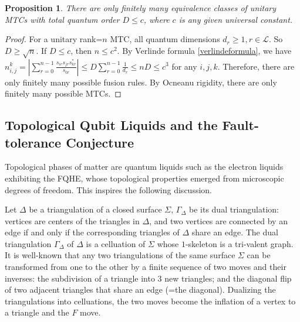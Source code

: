 \documentclass[12pt,psamsfonts]{amsart}
\newcommand{\mL}{\mathcal{L}}
\numberwithin{equation}{section}
\newtheorem{prop}[theorem]{Proposition}
\theoremstyle{definition}
\begin{document}
\begin{prop}

There are only finitely many equivalence classes of unitary MTCs
with total quantum order $D\leq  c$, where $c$ is any given
universal constant.

\end{prop}

\begin{proof}

For a unitary rank=$n$ MTC, all quantum dimensions $d_r\geq 1,
r\in \mL$. So $D\geq \sqrt{n}$.  If $D\leq c$, then $n\leq c^2$.
By Verlinde formula \ref{verlindeformula}, we have
$n_{i,j}^k=|\sum_{r=0}^{n-1}
\frac{s_{ir}s_{jr}s^{*}_{kr}}{s_{0r}}|\leq
D\sum_{r=0}^{n-1}\frac{1}{d_r}\leq nD\leq c^3$ for any $i,j,k$.
Therefore, there are only finitely many possible fusion rules.  By
Ocneanu rigidity, there are only finitely many possible MTCs.

\end{proof}

\subsection{Topological Qubit Liquids and the Fault-tolerance Conjecture}

 Topological phases of matter are quantum liquids such as the
 electron liquids exhibiting the FQHE, whose topological
 properties emerged from microscopic degrees of freedom.  This
 inspires the following discussion.

 Let $\Delta$ be a triangulation of a closed surface $\Sigma$,
 $\Gamma_{\Delta}$ be its dual triangulation: vertices are centers
 of the triangles in $\Delta$, and two vertices are connected by
 an edge if and only if the corresponding triangles of $\Delta$
 share an edge.  The dual triangulation $\Gamma_{\Delta}$ of
 $\Delta$ is a celluation of $\Sigma$ whose $1$-skeleton is a
 tri-valent graph.  It is well-known that any two triangulations
 of the same surface $\Sigma$ can be transformed from one to the other by
 a finite sequence of two moves and their inverses: the
 subdivision of a triangle into $3$ new triangles; and
 the diagonal flip of two adjacent triangles that share an edge
 (=the diagonal).  Dualizing the triangulations into celluations, the two
 moves become the inflation of a vertex to a triangle and the $F$ move.
\end{document}
